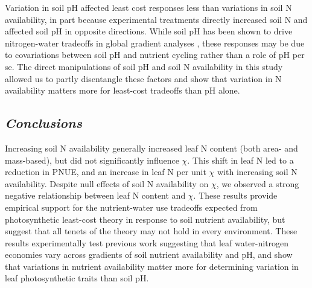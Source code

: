     Variation in soil pH affected least cost responses less than variations in soil N availability, in part because experimental treatments directly increased soil N and affected soil pH in opposite directions. While soil pH has been shown to drive nitrogen-water tradeoffs in global gradient analyses , these responses may be due to covariations between soil pH and nutrient cycling rather than a role of pH per se. The direct manipulations of soil pH and soil N availability in this study allowed us to partly disentangle these factors and show that variation in N availability matters more for least-cost tradeoffs than pH alone.

    \subsection{\textit{Conclusions}}
    Increasing soil N availability generally increased leaf N content (both area- and mass-based), but did not significantly influence $\chi$. This shift in leaf N led to a reduction in PNUE, and an increase in leaf N per unit $\chi$ with increasing soil N availability. Despite null effects of soil N availability on $\chi$, we observed a strong negative relationship between leaf N content and $\chi$. These results provide empirical support for the nutrient-water use tradeoffs expected from photosynthetic least-cost theory in response to soil nutrient availability, but suggest that all tenets of the theory may not hold in every environment. These results experimentally test previous work suggesting that leaf water-nitrogen economies vary across gradients of soil nutrient availability and pH, and show that variations in nutrient availability matter more for determining variation in leaf photosynthetic traits than soil pH.
